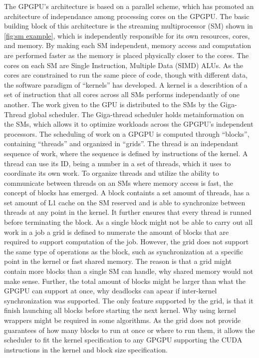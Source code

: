 The GPGPU's architecture is based on a parallel scheme, which has promoted an architecture of independance among processing cores on the GPGPU.
The basic building block of this architecture is the streaming multiprocessor (SM) shown in \cref{fig:sm example}, which is independently responsible for its own resources, cores, and memory.
By making each SM independent, memory access and computation are performed faster as the memory is placed physically closer to the cores.
The cores on each SM are Single Instruction, Multiple Data (SIMD) ALUs.
As the cores are constrained to run the same piece of code, though with different data, the software paradigm of ``kernels'' has developed.
A kernel is a describtion of a set of instruction that all cores across all SMs performs independantly of one another.
The work given to the GPU is distributed to the SMs by the Giga-Thread global scheduler.
The Giga-thread scheduler holds metainformation on the SMs, which allows it to optimize workloads across the GPGPU's independent processors.
The scheduling of work on a GPGPU is computed through ``blocks'', containing ``threads'' and organized in ``grids''.
The thread is an independant sequence of work, where the sequence is defined by instructions of the kernel.
A thread can use its ID, being a number in a set of threads, which it uses to coordinate its own work.
To organize threads and utilize the ability to communicate between threads on an SMs where memory access is fast, the concept of blocks has emerged.
A block containts a set amount of threads, has a set amount of L1 cache on the SM reserved and is able to synchronize between threads at any point in the kernel.
It further ensures that every thread is runned before terminating the block.
As a single block might not be able to carry out all work in a job a grid is defined to numerate the amount of blocks that are required to support computation of the job.
However, the grid does not support the same type of operations as the block, such as synchronization at a specific point in the kernel or fast shared memory.
The reason is that a grid might contain more blocks than a single SM can handle, why shared memory would not make sense.
Further, the total amount of blocks might be larger than what the GPGPU can support at once, why deadlocks can apear if inter-kernel synchronization was supported.
The only feature supported by the grid, is that it finish launching all blocks before starting the next kernel.
Why using kernel wrappers might be required in some algorithms.
As the grid does not provide guarantees of how many blocks to run at once or where to run them, it allows the scheduler to fit the kernel specification to any GPGPU supporting the CUDA instructions in the kernel and block size specification.

